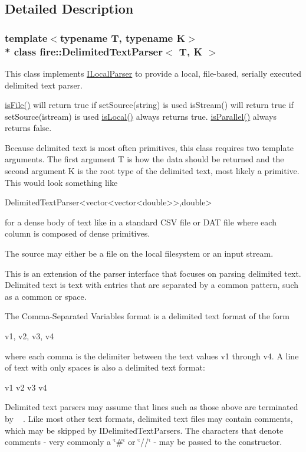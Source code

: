 \subsection{Detailed Description}
\subsubsection*{template$<$typename T, typename K$>$\\*
class fire\+::\+Delimited\+Text\+Parser$<$ T, K $>$}

This class implements \hyperlink{a00012}{I\+Local\+Parser} to provide a local, file-\/based, serially executed delimited text parser.

\hyperlink{a00012_a091d5cf56bf8f407854ef87f460b2958}{is\+File()} will return true if set\+Source(string) is used is\+Stream() will return true if set\+Source(istream) is used \hyperlink{a00012_a770acae6e216de3a9c7140a12de25d58}{is\+Local()} always returns true. \hyperlink{a00012_ad46898c516adcce38acbb4800dc9777b}{is\+Parallel()} always returns false.

Because delimited text is most often primitives, this class requires two template arguments. The first argument T is how the data should be returned and the second argument K is the root type of the delimited text, most likely a primitive. This would look something like


\begin{DoxyCode}
DelimitedTextParser<vector<vector<double>>,\textcolor{keywordtype}{double}>
\end{DoxyCode}


for a dense body of text like in a standard C\+SV file or D\+AT file where each column is composed of dense primitives.

The source may either be a file on the local filesystem or an input stream.

This is an extension of the parser interface that focuses on parsing delimited text. Delimited text is text with entries that are separated by a common pattern, such as a common or space.

The Comma-\/\+Separated Variables format is a delimited text format of the form

v1, v2, v3, v4

where each comma is the delimiter between the text values v1 through v4. A line of text with only spaces is also a delimited text format\+:

v1 v2 v3 v4

Delimited text parsers may assume that lines such as those above are terminated by ~\newline
. Like most other text formats, delimited text files may contain comments, which may be skipped by I\+Delimited\+Text\+Parsers. The characters that denote comments -\/ very commonly a \char`\"{}\#\char`\"{} or \char`\"{}//\char`\"{} -\/ may be passed to the constructor. 

